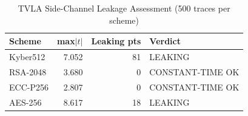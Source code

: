 \begin{table}[h]\centering
\caption{TVLA Side-Channel Leakage Assessment (500 traces per scheme)}
\label{tab:tvla}
\begin{tabular}{@{}lrrl@{}}\toprule
Scheme & max$|t|$ & Leaking pts & Verdict \\ \midrule
Kyber512 & 7.052 & 81 & LEAKING \\
RSA-2048 & 3.680 & 0 & CONSTANT-TIME OK \\
ECC-P256 & 2.807 & 0 & CONSTANT-TIME OK \\
AES-256 & 8.617 & 18 & LEAKING \\
\bottomrule\end{tabular}\end{table}